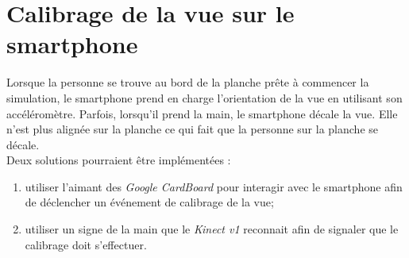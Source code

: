 \section*{Calibrage de la vue sur le smartphone}  \label{calibrage}

Lorsque la personne se trouve au bord de la planche  prête à commencer la simulation, le \textsf{smartphone} prend en charge l'orientation de la vue en utilisant son accéléromètre. Parfois, lorsqu'il prend la main, le \textsf{smartphone} décale la vue. Elle n'est plus alignée sur la planche ce qui fait que la personne sur la planche se décale.\\

Deux solutions pourraient être implémentées : 
\begin{enumerate}
\item utiliser l'aimant des \textit{Google CardBoard} pour interagir avec le \textsf{smartphone} afin de déclencher un événement de calibrage de la vue;
\item utiliser un signe de la main que le \textit{Kinect v1} reconnait afin de signaler que le calibrage doit s'effectuer.
\end{enumerate} 